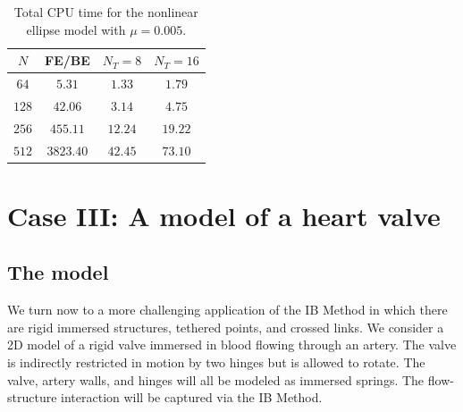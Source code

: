 \documentclass[preprint,12pt]{elsarticle}
\begin{document}
\begin{table}
\caption{Total CPU time for the nonlinear ellipse model with $\mu=0.005$.}
\label{table:NonlinearEllipseSims_005CPU}
\begin{center}
\begin{tabular}{|c|c| c c|}
\hline
$N$ & FE/BE & $N_T = 8$ & $N_T = 16$\\
\hline
$64$ & $5.31$ & $1.33$ & $1.79$ \\
$128$ & $42.06$ & $3.14$ & $4.75$ \\
$256$ & $455.11$ & $12.24$ & $19.22$ \\
$512$ & $3823.40$ & $42.45$ & $73.10$ \\
\hline
\end{tabular}
\end{center}
\end{table}











\section{Case III: A model of a heart valve}
\label{Sec:valve}
\subsection{The model}
We turn now to a more challenging application of the IB Method in which there are rigid immersed
structures, tethered points, and crossed links. 
We consider a 2D model of a rigid valve immersed in blood flowing through an artery. The valve is indirectly restricted in motion by two hinges but is allowed to rotate. The valve, artery walls, and hinges will all be modeled as immersed springs. The flow-structure interaction will be captured 
via the IB Method.
\end{document}
